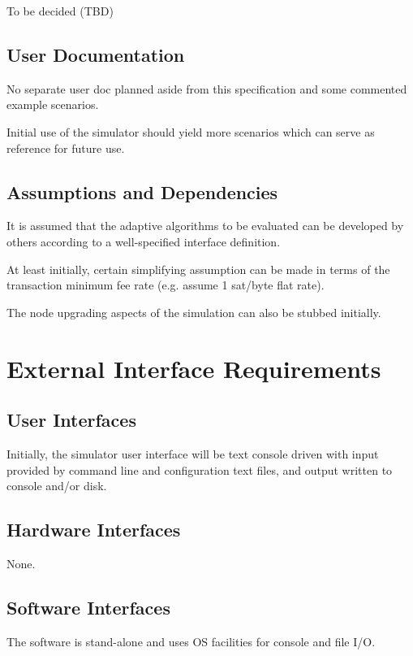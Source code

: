 \documentclass{scrreprt}
\begin{document}
    To be decided (TBD)

  \section{User Documentation}

    No separate user doc planned aside from this specification and some
    commented example scenarios.

    Initial use of the simulator should yield more scenarios which can serve as
    reference for future use.

  \section{Assumptions and Dependencies}

    It is assumed that the adaptive algorithms to be evaluated can be developed
    by others according to a well-specified interface definition.

    At least initially, certain simplifying assumption can be made in terms
    of the transaction minimum fee rate (e.g. assume 1 sat/byte flat rate).

    The node upgrading aspects of the simulation can also be stubbed initially.

\chapter{External Interface Requirements}

  \section{User Interfaces}

    Initially, the simulator user interface will be text console driven with
    input provided by command line and configuration text files, and output
    written to console and/or disk.

  \section{Hardware Interfaces}

    None.

  \section{Software Interfaces}

    The software is stand-alone and uses OS facilities for console and file
    I/O.
\end{document}
